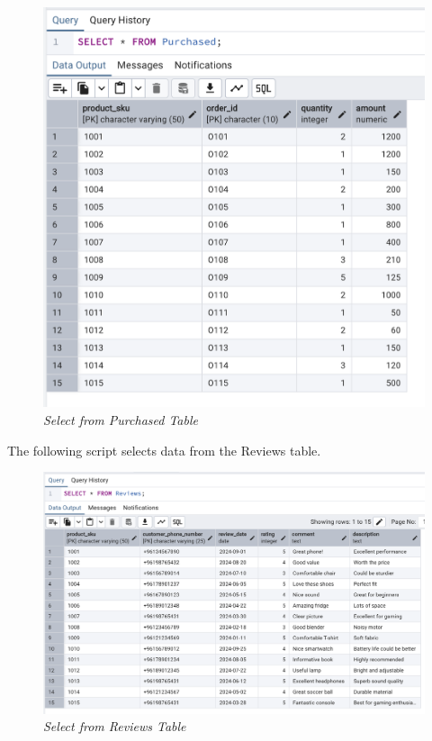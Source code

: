 \begin{figure}[H]
  \centering
  \includegraphics[width=1\textwidth]{images/sql/select/purchased.png}
  \caption{\textit{Select from Purchased Table}}
\end{figure}

The following script selects data from the Reviews table.


\begin{figure}[H]
  \centering
  \includegraphics[width=1\textwidth]{images/sql/select/reviews.png}
  \caption{\textit{Select from Reviews Table}}
\end{figure}

